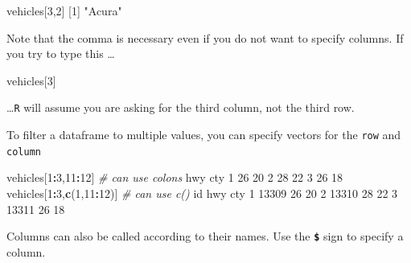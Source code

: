 \documentclass[
]{book}
\newenvironment{Shaded}{\begin{snugshade}}{\end{snugshade}}
\newcommand{\CommentTok}[1]{\textcolor[rgb]{0.56,0.35,0.01}{\textit{#1}}}
\newcommand{\DecValTok}[1]{\textcolor[rgb]{0.00,0.00,0.81}{#1}}
\newcommand{\KeywordTok}[1]{\textcolor[rgb]{0.13,0.29,0.53}{\textbf{#1}}}
\newcommand{\NormalTok}[1]{#1}
\newcommand{\OperatorTok}[1]{\textcolor[rgb]{0.81,0.36,0.00}{\textbf{#1}}}
\newcommand{\StringTok}[1]{\textcolor[rgb]{0.31,0.60,0.02}{#1}}
\begin{document}
\begin{Shaded}
\begin{Highlighting}[]
\NormalTok{vehicles[}\DecValTok{3}\NormalTok{,}\DecValTok{2}\NormalTok{]}
\NormalTok{[}\DecValTok{1}\NormalTok{] }\StringTok{"Acura"}
\end{Highlighting}
\end{Shaded}

Note that the comma is necessary even if you do not want to specify columns. If you try to type this \ldots{}

\begin{Shaded}
\begin{Highlighting}[]
\NormalTok{vehicles[}\DecValTok{3}\NormalTok{]}
\end{Highlighting}
\end{Shaded}

\ldots{}\texttt{R} will assume you are asking for the third column, not the third row.

To filter a dataframe to multiple values, you can specify vectors for the \texttt{row} and \texttt{column}

\begin{Shaded}
\begin{Highlighting}[]
\NormalTok{vehicles[}\DecValTok{1}\OperatorTok{:}\DecValTok{3}\NormalTok{,}\DecValTok{11}\OperatorTok{:}\DecValTok{12}\NormalTok{] }\CommentTok{# can use colons}
\NormalTok{  hwy cty}
\DecValTok{1}  \DecValTok{26}  \DecValTok{20}
\DecValTok{2}  \DecValTok{28}  \DecValTok{22}
\DecValTok{3}  \DecValTok{26}  \DecValTok{18}
\NormalTok{vehicles[}\DecValTok{1}\OperatorTok{:}\DecValTok{3}\NormalTok{,}\KeywordTok{c}\NormalTok{(}\DecValTok{1}\NormalTok{,}\DecValTok{11}\OperatorTok{:}\DecValTok{12}\NormalTok{)]  }\CommentTok{# can use c()}
\NormalTok{     id hwy cty}
\DecValTok{1} \DecValTok{13309}  \DecValTok{26}  \DecValTok{20}
\DecValTok{2} \DecValTok{13310}  \DecValTok{28}  \DecValTok{22}
\DecValTok{3} \DecValTok{13311}  \DecValTok{26}  \DecValTok{18}
\end{Highlighting}
\end{Shaded}

Columns can also be called according to their names. Use the \textbf{\texttt{\$}} sign to specify a column.

\begin{Shaded}
\end{Shaded}
\end{document}
